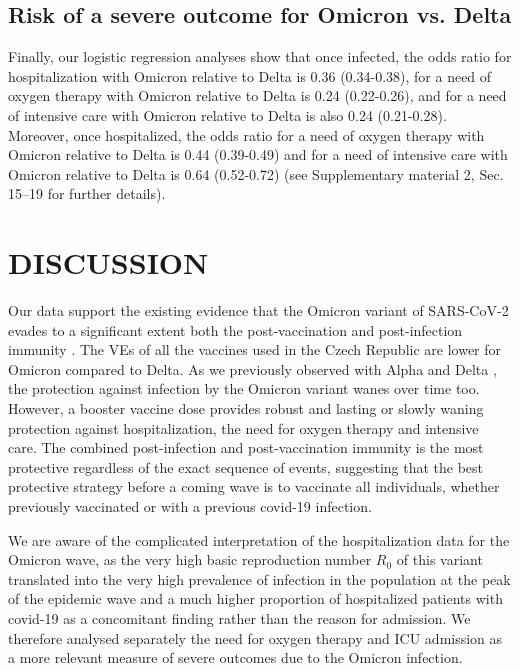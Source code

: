 \documentclass[a4paper,12pt]{article}
\begin{document}
\subsection*{Risk of a severe outcome for Omicron vs. Delta}

Finally, our logistic regression analyses show that once infected, the odds ratio for hospitalization with Omicron relative to Delta is 0.36 (0.34-0.38), for a need of oxygen therapy with Omicron relative to Delta is 0.24 (0.22-0.26), and for a need of intensive care with Omicron relative to Delta is also 0.24 (0.21-0.28). Moreover, once hospitalized, the odds ratio for a need of oxygen therapy with Omicron relative to Delta is 0.44 (0.39-0.49) and for a need of intensive care with Omicron relative to Delta is 0.64 (0.52-0.72) (see Supplementary material 2, Sec. 15--19 for further details).

\section*{DISCUSSION}
\label{sec4}

Our data support the existing evidence that the Omicron variant of SARS-CoV-2 evades to a significant extent both the post-vaccination and post-infection immunity \citep{mccallum2022,Dejnirattisai2022,Hoffmann2022,Cui2022,Cao2021}. The VEs of all the vaccines used in the Czech Republic are lower for Omicron compared to Delta. As we previously observed with Alpha and Delta \citep{Berec2021preprint}, the protection against infection by the Omicron variant wanes over time too. However, a booster vaccine dose provides robust and lasting or slowly waning protection against hospitalization, the need for oxygen therapy and intensive care. The combined post-infection and post-vaccination immunity is the most protective regardless of the exact sequence of events, suggesting that the best protective strategy before a coming wave is to vaccinate all individuals, whether previously vaccinated or with a previous covid-19 infection.

We are aware of the complicated interpretation of the hospitalization data for the Omicron wave, as the very high basic reproduction number $R_0$ of this variant \cite{nishiura2022relative} translated into the very high prevalence of infection in the population at the peak of the epidemic wave and a much higher proportion of hospitalized patients with covid-19 as a concomitant finding rather than the reason for admission. We therefore analysed separately the need for oxygen therapy and ICU admission as a more relevant measure of severe outcomes due to the Omicron infection.
\end{document}
